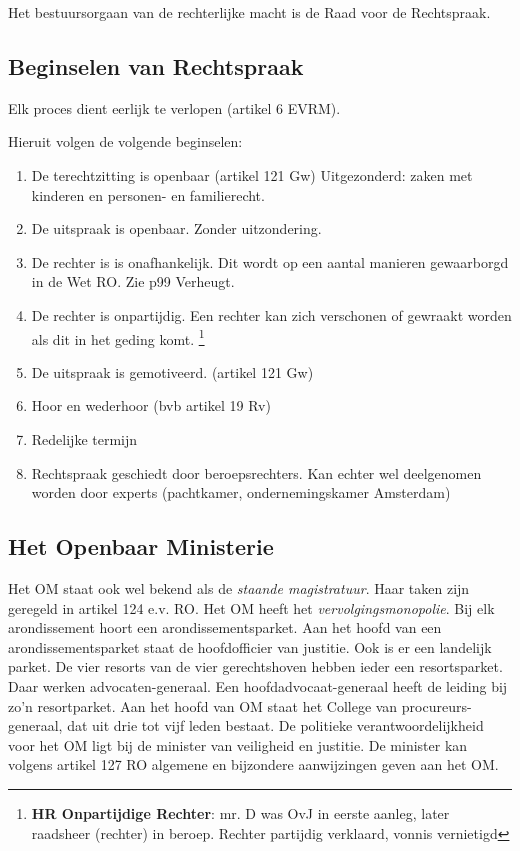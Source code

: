 \documentclass{article}
\begin{document}
Het bestuursorgaan van de rechterlijke macht is de Raad voor de Rechtspraak. 

\subsection{Beginselen van Rechtspraak}
\label{beginselenrechtspraak}
Elk proces dient eerlijk te verlopen (artikel 6 EVRM). 

Hieruit volgen de volgende beginselen:

\begin{enumerate}
  \item De terechtzitting is openbaar (artikel 121 Gw) Uitgezonderd: zaken met
    kinderen en personen- en familierecht. 
  \item De uitspraak is openbaar. Zonder uitzondering.
  \item De rechter is is onafhankelijk. Dit wordt op een aantal manieren gewaarborgd 
    in de Wet RO. Zie p99 Verheugt.
  \item De rechter is onpartijdig. Een rechter kan zich verschonen of gewraakt worden 
    als dit in het geding komt. \footnote{\textbf{HR Onpartijdige Rechter}: mr. D was 
    OvJ in eerste aanleg, later raadsheer (rechter) in beroep. Rechter partijdig verklaard,
    vonnis vernietigd}
  \item De uitspraak is gemotiveerd. (artikel 121 Gw) 
  \item Hoor en wederhoor (bvb artikel 19 Rv) 
  \item Redelijke termijn 
  \item Rechtspraak geschiedt door beroepsrechters. Kan echter wel deelgenomen worden
    door experts (pachtkamer, ondernemingskamer Amsterdam)
\end{enumerate}

\subsection{Het Openbaar Ministerie}

Het OM staat ook wel bekend als de \emph{staande magistratuur}. Haar taken zijn geregeld
in artikel 124 e.v. RO. Het OM heeft het \emph{vervolgingsmonopolie}. Bij elk arondissement
hoort een arondissementsparket. Aan het hoofd van een arondissementsparket staat de hoofdofficier
van justitie. Ook is er een landelijk parket. De vier resorts van de vier gerechtshoven hebben
ieder een resortsparket. Daar werken advocaten-generaal. Een hoofdadvocaat-generaal heeft de
leiding bij zo'n resortparket. Aan het hoofd van OM staat het College van procureurs-generaal,
dat uit drie tot vijf leden bestaat. De politieke verantwoordelijkheid voor het OM ligt bij
de minister van veiligheid en justitie. De minister kan volgens artikel 127 RO algemene
en bijzondere aanwijzingen geven aan het OM. 
\end{document}
